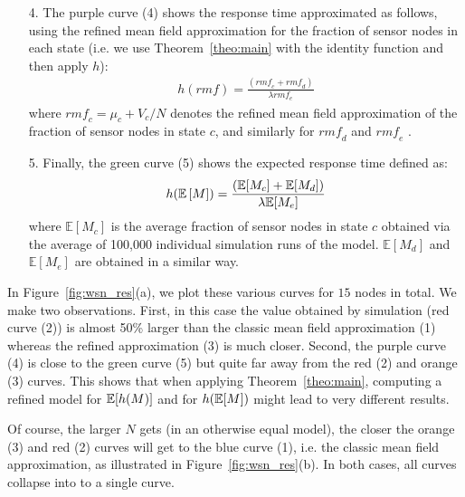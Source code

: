 \documentclass{amsart}
\begin{document}
\begin{itemize}
\item[4.] The purple curve (4) shows the response time approximated as
  follows, using the refined mean field approximation for the fraction
  of sensor nodes in each state (i.e. we use Theorem~\ref{theo:main}
  with the identity function and then apply $h$):
  \begin{align*}
    h(\mathit{rmf}) = \frac{(\mathit{rmf\!}_c + \mathit{rmf\!}_d)}{\lambda
    \mathit{rmf\!}_e}
  \end{align*}
  where $\mathit{rmf\!}_c=\mu_c+V_c/N$ denotes the refined mean field
  approximation of the fraction of sensor nodes in state $c$, and
  similarly for $\mathit{rmf\!}_d$ and $\mathit{rmf\!}_e$ .
\item[5.] Finally, the green curve (5) shows the expected response time
  defined as:
  \begin{align*}
    h(\esp{M}) = \frac{(\mathbb{E}[M_c] + \mathbb{E}[M_d])}{\lambda
    \mathbb{E}[M_e]}
  \end{align*}
  where $\mathbb{E}[M_c]$ is the average fraction of sensor nodes in
  state $c$ obtained via the average of 100,000 individual simulation
  runs of the model. $\mathbb{E}[M_d]$ and $\mathbb{E}[M_e]$ are obtained in a
  similar way.
\end{itemize}
In Figure~\ref{fig:wsn_res}(a), we plot these various curves for $15$
nodes in total. We make two observations. First, in this case the
value obtained by simulation (red curve (2)) is almost 50\% larger
than the classic mean field approximation (1) whereas the refined
approximation (3) is much closer. Second, the purple curve (4) is
close to the green curve (5) but quite far away from the red (2) and
orange (3) curves. This shows that when applying
Theorem~\ref{theo:main}, computing a refined model for $\esp{h(M)}$
and for $h(\esp{M})$ might lead to very different results.

Of course, the larger $N$ gets (in an otherwise equal model), the
closer the orange (3) and red (2) curves will get to the blue curve (1),
i.e. the classic mean field approximation, as illustrated in
Figure~\ref{fig:wsn_res}(b). In both cases, all curves collapse
into to a single curve. 
\end{document}
